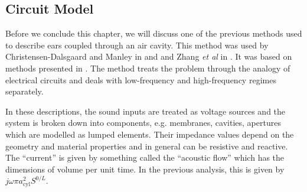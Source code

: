 \subsection{Circuit Model}
Before we conclude this chapter, we will discuss one of the previous methods used to describe ears coupled through
an air cavity. This method was used by Christensen-Dalsgaard and Manley in \cite{dalsgaardmanley1} and \cite{dalsgaardmanley2}
and Zhang \emph{et al} in \cite{zhanghallam}.
It was based on methods presented in \cite{fletcheracoustic}. The method treats the problem through the analogy of electrical circuits
and deals with low-frequency and high-frequency regimes separately.

In these descriptions, the sound inputs are treated as voltage sources and the system is broken down into components, e.g.	 membranes,
cavities, apertures which are modelled as lumped elements. Their impedance values depend on the geometry and material properties and in general
 can be resistive and reactive. The ``current'' is given by something called the ``acoustic flow'' which has the dimensions of
volume per unit time. In the previous analysis, this is given by $j\omega\pi a^2_{\mathrm{cyl}}S^{0/L}$. 

